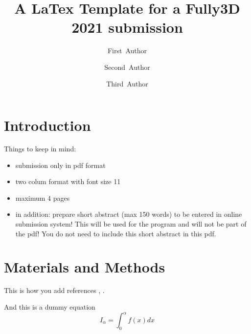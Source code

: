 \documentclass[11pt,twocolumn,twoside]{article}
\begin{document}

\title{\sffamily\bfseries A LaTex Template for a Fully3D 2021 submission} 

\author[1]{\small First~Author}
\author[1]{\small Second~Author}
\author[2]{\small Third~Author}



\date{}
\maketitle
\thispagestyle{fancy}


\section{Introduction}

Things to keep in mind:
\begin{itemize}
\item submission only in pdf format
\item two colum format with font size 11
\item maximum 4 pages
\item in addition: prepare short abstract (max 150 words) 
      to be entered in online submission system!
      This will be used for the program and will not be part of the pdf!
      You do not need to include this short abstract in this pdf.
\end{itemize}


\section{Materials and Methods}

This is how you add references \cite{Deen2019}, \cite{Doe2020}.

And this is a dummy equation
\begin{equation}
I_\alpha = \int_0^\alpha f(x) dx
\end{equation}
\end{document}
